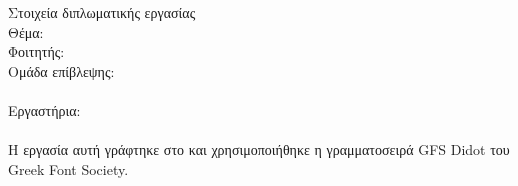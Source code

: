 \pagestyle{empty}

\begin{center}

\Large{Στοιχεία διπλωματικής εργασίας}\\[1cm]

{\large Θέμα:}
\textbf{\large \doctitle}\\[1cm]
\large {Φοιτητής: \textbf{\me}\\[1cm]
\large{Ομάδα επίβλεψης:}\\
\textbf{\suptitle \, \supname}\\[1cm]
Εργαστήρια:\\
\lab \\[1cm]
Η εργασία αυτή γράφτηκε στο \XeLaTeX{} και χρησιμοποιήθηκε η γραμματοσειρά GFS Didot του Greek Font Society.}
\end{center}